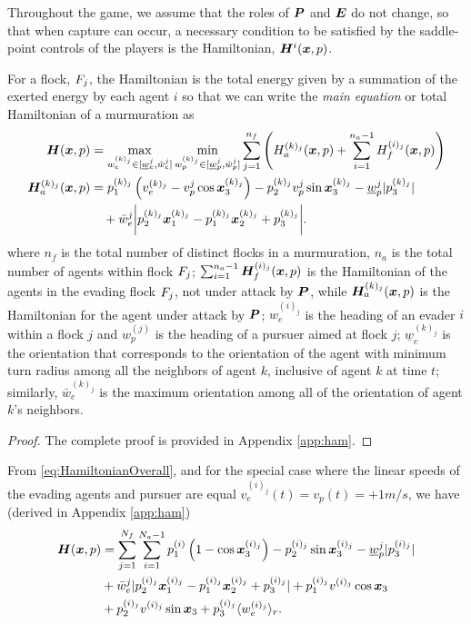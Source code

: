 Throughout the game, we assume that the roles of $\bm{P}$  and $\bm{E}$ do not change, so that when capture can occur, a necessary condition to be satisfied by the saddle-point controls of the players is the Hamiltonian, $\bm{H}^i(\bm{x}, p)$.  
%
\begin{theorem}
	For  a flock, $F_j$, the Hamiltonian is the total energy given by a summation of the exerted energy by each agent $i$ so that we can write the \textit{main equation} or total Hamiltonian of a murmuration as 
	\begin{align}
		\bm{H}(\bm{x}, p) &= \max_{w_e^{(k)_j} \in [\underline{w}_e^j, \bar{w}_e^j]}  \min_{w_p^{(k)_j}  \in [\underline{w}_p^{j}, \bar{w}_p^j]} \sum_{j=1}^{n_f} \left( H^{(k)_j}_a(\bm{x}, p) + \sum_{i=1}^{n_a-1} H^{(i)_j}_f(\bm{x}, p)  \right) \\
		\bm{H}^{(k)_j}_a(\bm{x}, p) &= p_1^{(k)_j} \left(v_e^{(k)_j} - v_p^{j} \cos \bm{x}_3^{(k)_j}\right) - p_2^{(k)_j} v_p^{j}  \sin \bm{x}_3^{(k)_j} - \underline{w}_p^j |p_3^{(k)_j}| \nonumber 	\\
			& \quad +  \bar{w}_e^j \bigg|p_2^{(k)_j} \bm{x}_1^{(k)_j} - p_1^{(k)_j}\bm{x}_2^{(k)_j} + p_3^{(k)_j}\bigg|.
		\label{eq:HamiltonianOverall}
	\end{align}
	where $n_f$ is the total number of distinct flocks in a murmuration, $n_a$ is the total number of agents within flock $F_j$; $\sum_{i=1}^{n_a-1} \bm{H}^{(i)_j}_f(\bm{x}, p)$ is the  Hamiltonian of the agents in the evading flock $F_j$, not under attack by $\bm{P}$, while $\bm{H}^{(k)_j}_a(\bm{x}, p)$ is the Hamiltonian for the agent under attack by $\bm{P}$;  $w_e^{(i)_j}$ is the heading of an evader $i$ within a flock $j$ and $w_p^{(j)}$ is the heading of a pursuer aimed at flock $j$; $\underline{w}_e^{(k)_j}$ is the orientation that corresponds to  the orientation of the agent with minimum turn radius among all the neighbors of agent $k$, inclusive of agent $k$ at time $t$; similarly, $\bar{w}_e^{(k)_j}$ is  the maximum orientation among all of the orientation of agent $k$'s neighbors. 
	\label{th:ham_sum}
\end{theorem}
%
\begin{proof}
	The complete proof is provided in Appendix \ref{app:ham}.
\end{proof}
%
From \eqref{eq:HamiltonianOverall}, and for the special case where the linear speeds of the evading agents and pursuer are equal \ie $v_e^{(i)_j}(t) = v_p(t) = +1 m/s$, we have (derived in Appendix \ref{app:ham})
%
\begin{align}
	\bm{H}(\bm{x}, p) &= \sum_{j=1}^{N_f} \sum_{i=1}^{N_a-1} p_1^{(i)} \left(1 - \cos \bm{x}_3^{(i)_j}\right) - p_2^{(i)_j} \sin \bm{x}_3^{(i)_j} - \underline{w}_p^j | p_3^{(i)_j}  |
	\nonumber 	\\
	& 
	+ \bar{w}_e^j | p_2^{(i)_j} \bm{x}_1^{(i)_j} - p_1^{(i)_j}\bm{x}_2^{(i)_j} + p_3^{(i)_j}| +
	p_1^{(i)_j}v^{(i)_j} \cos \bm{x}_3 
	\nonumber 	\\
	&+ p_2^{(i)_j} v^{(i)_j} \sin \bm{x}_3 + p_3^{(i)_j} \langle w_e^{(i)_j}\rangle_r.
	\label{eq:HamiltonianCompletada}
\end{align}
%

